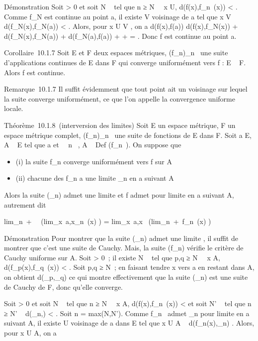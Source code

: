 \documentclass[]{article}
\begin{document}
Démonstration Soit \epsilon > 0 et soit N \in {}~ tel que n ≥ N
\rigtharrow~\forall~x \in U, d(f(x),f_n~(x)) <
\epsilon {} . Comme f_N est continue au point a,
il existe V voisinage de a tel que x \in V \rigtharrow~
d(f_N(x),f_N(a)) < \epsilon {} . Alors, pour x \in U \bigcap V , on a d(f(x),f(a)) \leq
d(f(x),f_N(x)) + d(f_N(x),f_N(a)) +
d(f_N(a),f(a)) \leq \epsilon {} + \epsilon
{} + \epsilon {} = \epsilon. Donc f est
continue au point a.

Corollaire~10.1.7 Soit E et F deux espaces métriques,
(f_n)_n\in{}~ une suite d'applications continues de E dans
F qui converge uniformément vers f : E \rightarrow~ F. Alors f est continue.

Remarque~10.1.7 Il suffit évidemment que tout point ait un voisinage sur
lequel la suite converge uniformément, ce que l'on appelle la
convergence uniforme locale.

Théorème~10.1.8~(interversion des limites) Soit E un espace métrique, F
un espace métrique complet, (f_n)_n\in{}~ une suite de
fonctions de E dans F. Soit a \in E, A \subset~ E tel que a
\in\overlineA et \forall~~n \in {}~, A
\subset~ Def (f_n~). On suppose que

\begin{itemize}
\itemsep1pt\parskip0pt
\item
  (i) la suite f_n converge uniformément vers f sur A
\item
  (ii) chacune des f_n a une limite \ell_n en a suivant A
\end{itemize}

Alors la suite (\ell_n) admet une limite \ell et f admet \ell pour
limite en a suivant A, autrement dit

lim_n\rightarrow~+\infty~~\left
(lim_x\rightarrow~a,x\inAf_n~(x)\right
) = lim_x\rightarrow~a,x\inA~\left
(lim_n\rightarrow~+\infty~f_n~(x)\right
)

Démonstration Pour montrer que la suite (\ell_n) admet une limite
\ell, il suffit de montrer que c'est une suite de Cauchy. Mais, la suite
(f_n) vérifie le critère de Cauchy uniforme sur A. Soit \epsilon
> 0~; il existe N \in {}~ tel que p,q ≥ N
\rigtharrow~\forall~x \in A, d(f_p(x),f_q~(x))
< \epsilon. Soit p,q ≥ N~; en faisant tendre x vers a en restant dans
A, on obtient d(\ell_p,\ell_q) \leq \epsilon ce qui montre
effectivement que la suite (\ell_n) est une suite de Cauchy de F,
donc qu'elle converge.

Soit \epsilon > 0 et soit N \in {}~ tel que n ≥ N
\rigtharrow~\forall~x \in A, d(f(x),f_n~(x)) <
\epsilon {} et soit N' \in {}~ tel que n ≥ N' \rigtharrow~
d(\ell_n,\ell) < \epsilon {} . Soit n
= max(N,N'). Comme f_n~ admet
\ell_n pour limite en a suivant A, il existe U voisinage de a dans
E tel que x \in U \bigcap A \rigtharrow~ d(f_n(x),\ell_n) \leq \epsilon
{} . Alors, pour x \in U \bigcap A, on a
\end{document}
